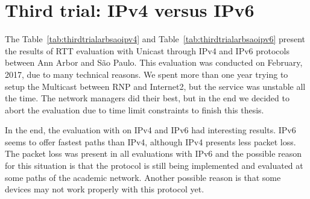 \section{Third trial: IPv4 versus IPv6}
\label{sec:thirdtrial}

The Table~\ref{tab:thirdtrialarbsaoipv4} and Table~\ref{tab:thirdtrialarbsaoipv6} present the results of RTT evaluation with Unicast through IPv4 and IPv6 protocols between Ann Arbor and São Paulo.
This evaluation was conducted on February, 2017, due to many technical reasons.
We spent more than one year trying to setup the Multicast between RNP and Internet2, but the service was unstable all the time.
The network managers did their best, but in the end we decided to abort the evaluation due to time limit constraints to finish this thesis.

In the end, the evaluation with on IPv4 and IPv6 had interesting results.
IPv6 seems to offer fastest paths than IPv4, although IPv4 presents less packet loss.
The packet loss was present in all evaluations with IPv6 and the possible reason for this situation is that the protocol is still being implemented and evaluated at some paths of the academic network.
Another possible reason is that some devices may not work properly with this protocol yet.



